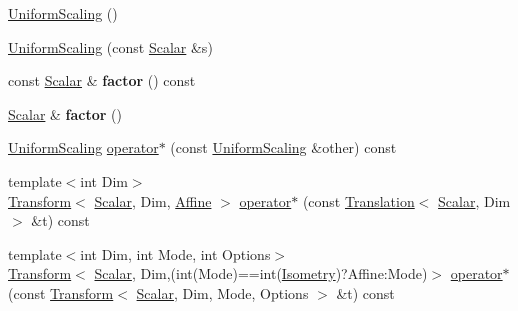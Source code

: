 \begin{DoxyCompactItemize}
\hyperlink{class_eigen_1_1_uniform_scaling_ab17e233af501c69ff47c0dd16f43cc39}{Uniform\+Scaling} ()
\item 
\hyperlink{class_eigen_1_1_uniform_scaling_a3a3e2fa318eb29c2c4f87e23a8a75144}{Uniform\+Scaling} (const \hyperlink{class_eigen_1_1_uniform_scaling_a04c4339f58f1210c5d4d34b1bd7ae283}{Scalar} \&s)
\item 
\mbox{\label{class_eigen_1_1_uniform_scaling_a600949d7c5ed124adacaba53b631b6e6}} 
const \hyperlink{class_eigen_1_1_uniform_scaling_a04c4339f58f1210c5d4d34b1bd7ae283}{Scalar} \& {\bfseries factor} () const
\item 
\mbox{\label{class_eigen_1_1_uniform_scaling_a380501e65319cfa832da20730f0bf122}} 
\hyperlink{class_eigen_1_1_uniform_scaling_a04c4339f58f1210c5d4d34b1bd7ae283}{Scalar} \& {\bfseries factor} ()
\item 
\hyperlink{class_eigen_1_1_uniform_scaling}{Uniform\+Scaling} \hyperlink{class_eigen_1_1_uniform_scaling_af3044cffe5703a1946c33a953b0f9bb6}{operator$\ast$} (const \hyperlink{class_eigen_1_1_uniform_scaling}{Uniform\+Scaling} \&other) const
\item 
{\footnotesize template$<$int Dim$>$ }\\\hyperlink{group___geometry___module_class_eigen_1_1_transform}{Transform}$<$ \hyperlink{class_eigen_1_1_uniform_scaling_a04c4339f58f1210c5d4d34b1bd7ae283}{Scalar}, Dim, \hyperlink{group__enums_ggaee59a86102f150923b0cac6d4ff05107a71e768e0581725d919d0b05f4cb83234}{Affine} $>$ \hyperlink{class_eigen_1_1_uniform_scaling_a660b56b8279e5c56fb9a736b131c542d}{operator$\ast$} (const \hyperlink{group___geometry___module_class_eigen_1_1_translation}{Translation}$<$ \hyperlink{class_eigen_1_1_uniform_scaling_a04c4339f58f1210c5d4d34b1bd7ae283}{Scalar}, Dim $>$ \&t) const
\item 
{\footnotesize template$<$int Dim, int Mode, int Options$>$ }\\\hyperlink{group___geometry___module_class_eigen_1_1_transform}{Transform}$<$ \hyperlink{class_eigen_1_1_uniform_scaling_a04c4339f58f1210c5d4d34b1bd7ae283}{Scalar}, Dim,(int(Mode)==int(\hyperlink{group__enums_ggaee59a86102f150923b0cac6d4ff05107a080cd5366173608f701cd945c2335568}{Isometry})?Affine\+:\+Mode)$>$ \hyperlink{class_eigen_1_1_uniform_scaling_a0fc239af586bb24d7db99c6b8ce42373}{operator$\ast$} (const \hyperlink{group___geometry___module_class_eigen_1_1_transform}{Transform}$<$ \hyperlink{class_eigen_1_1_uniform_scaling_a04c4339f58f1210c5d4d34b1bd7ae283}{Scalar}, Dim, Mode, Options $>$ \&t) const

\end{DoxyCompactItemize}
